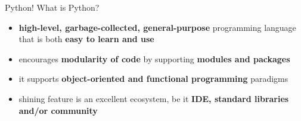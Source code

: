\begin{frame}{Python! What is Python?}
  \begin{itemize}
    \pause
  \item
    \textbf{high-level, garbage-collected, general-purpose} programming language that is both \textbf{easy to learn and use}
    \pause
    \vspace{0.1cm}
  \item
    encourages \textbf{modularity of code} by supporting \textbf{modules and packages}
    \pause
    \vspace{0.1cm}
  \item
    it supports \textbf{object-oriented and functional programming} paradigms
    \pause
    \vspace{0.1cm}
  \item
    shining feature is an excellent ecosystem, be it \textbf{IDE, standard libraries and/or community}
  \end{itemize}
\end{frame}
